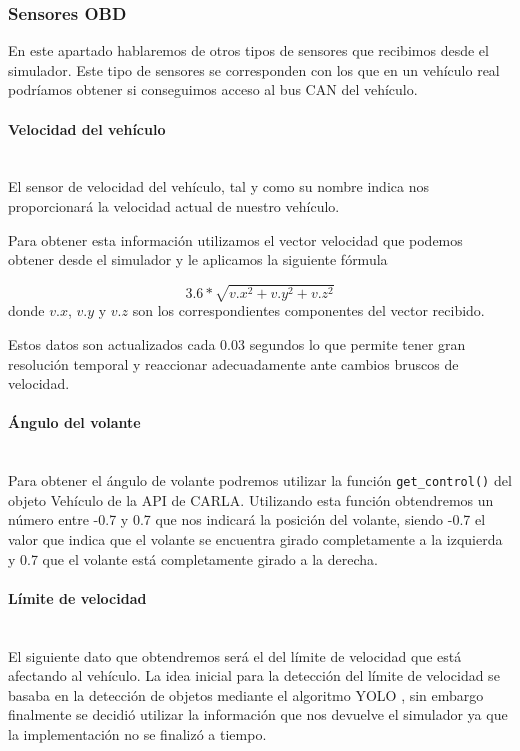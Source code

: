 \subsubsection{Sensores OBD}
En este apartado hablaremos de otros tipos de sensores que recibimos desde el simulador. Este tipo de sensores se corresponden con los que en un vehículo real podríamos obtener si conseguimos acceso al bus CAN del vehículo.

\paragraph{Velocidad del vehículo}\mbox{}\\
El sensor de velocidad del vehículo, tal y como su nombre indica nos proporcionará la velocidad actual de nuestro vehículo.

Para obtener esta información utilizamos el vector velocidad que podemos obtener desde el simulador y le aplicamos la siguiente fórmula

\begin{equation*}
    3.6* \sqrt{v.x ^2 + v.y ^2 + v.z ^2}
\end{equation*}
donde $v.x$, $v.y$ y $v.z$ son los correspondientes componentes del vector recibido.

Estos datos son actualizados cada 0.03 segundos lo que permite tener gran resolución temporal y reaccionar adecuadamente ante cambios bruscos de velocidad.


\paragraph{Ángulo del volante}\mbox{}\\
Para obtener el ángulo de volante podremos utilizar la función \texttt{get\_control()} del objeto Vehículo de la API de CARLA. Utilizando esta función obtendremos un número entre -0.7 y 0.7 que nos indicará la posición del volante, siendo -0.7 el valor que indica que el volante se encuentra girado completamente a la izquierda y 0.7 que el volante está completamente girado a la derecha.

\paragraph{Límite de velocidad}\mbox{}\\
El siguiente dato que obtendremos será el del límite de velocidad que está afectando al vehículo.
La idea inicial para la detección del límite de velocidad se basaba en la detección de objetos mediante el algoritmo YOLO \cite{yolov3}, sin embargo finalmente 
se decidió utilizar la información que nos devuelve el simulador ya que la implementación no se finalizó a tiempo. 

